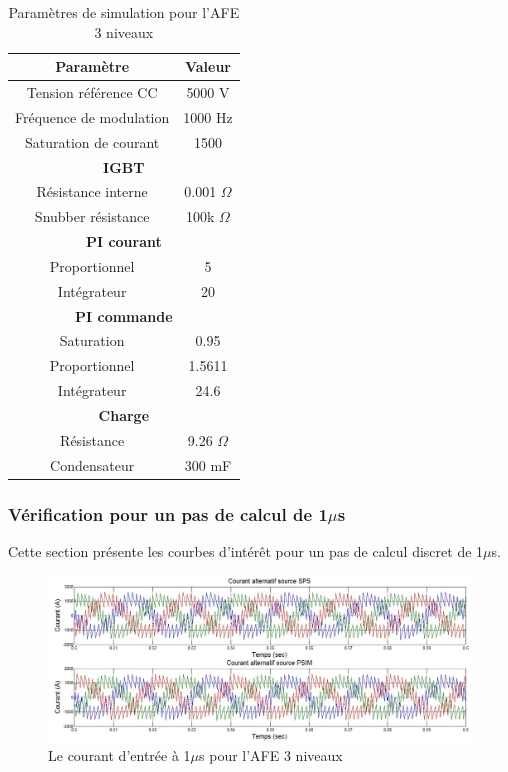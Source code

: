 \documentclass[11pt,letterpaper,final]{report}
\begin{document}
\begin{table}[htb]
\centering
\begin{tabular}{|c|c|} 
  \hline
  Paramètre & Valeur  \\
  \hline\hline
  Tension référence CC & 5000 V\\ \hline
  Fréquence de modulation & 1000 Hz \\ \hline
  Saturation de courant& 1500 \\ \hline \hline
  \multicolumn{2}{|c|}{\textbf{IGBT}}\\ \hline
  Résistance interne & 0.001 $\Omega$\\
  Snubber résistance & 100k $\Omega$\\ \hline \hline
   \multicolumn{2}{|c|}{\textbf{PI courant}}\\ \hline
  Proportionnel & 5 \\
  Intégrateur & 20 \\ \hline \hline
  \multicolumn{2}{|c|}{\textbf{PI commande}}\\ \hline
  Saturation & 0.95\\
  Proportionnel & 1.5611 \\
  Intégrateur & 24.6 \\ \hline \hline
  \multicolumn{2}{|c|}{\textbf{Charge}}\\ \hline
  Résistance & 9.26 $\Omega$ \\
  Condensateur & 300 mF\\
  \hline
\end{tabular}
\caption{Paramètres de simulation pour l'AFE 3 niveaux}
\label{p_AF_3level}
\end{table}

\subsubsection{Vérification pour un pas de calcul de 1$\mu$s}
Cette section présente les courbes d'intérêt pour un pas de calcul discret de 1$\mu$s. 

\begin{figure}[htb]
\centering
\includegraphics[scale=0.5]{Fig/AFE3LEVEL/1u/cour_al.jpg}
\caption{Le courant d'entrée à 1$\mu$s pour l'AFE 3 niveaux}
\label{AF_3_cou}
\end{figure}
\end{document}
